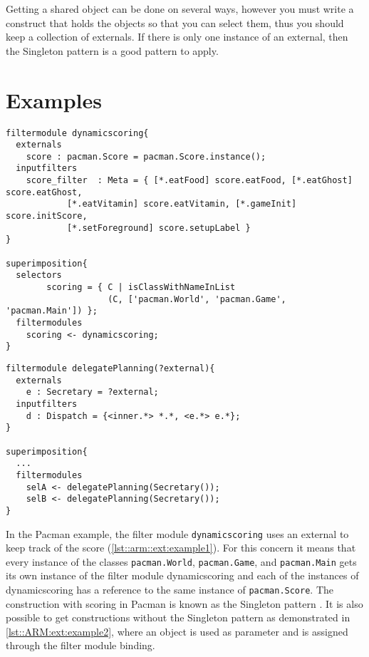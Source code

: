 Getting a shared object can be done on several ways, however you must write a construct that holds the objects so that
you can select them, thus you should keep a collection of externals. If there is only one instance of an external, then
the Singleton pattern is a good pattern to apply.

\section*{Examples}
\begin{lstlisting}[caption = {Dynamic scoring filter module from the Pacman example}, label = lst::arm::ext:example1,
style = listing, language = ComposeStar, float=tpb]
filtermodule dynamicscoring{
  externals
    score : pacman.Score = pacman.Score.instance();
  inputfilters 
    score_filter  : Meta = { [*.eatFood] score.eatFood, [*.eatGhost] score.eatGhost, 
			[*.eatVitamin] score.eatVitamin, [*.gameInit] score.initScore,
			[*.setForeground] score.setupLabel }
}

superimposition{
  selectors
		scoring = { C | isClassWithNameInList
		            (C, ['pacman.World', 'pacman.Game', 'pacman.Main']) };
  filtermodules
    scoring <- dynamicscoring;
}
\end{lstlisting}
\begin{lstlisting}[caption = {An external without the singleton construction}, label = lst::ARM:ext:example2,
style = listing, language = ComposeStar, float = tpb]
filtermodule delegatePlanning(?external){
  externals
    e : Secretary = ?external;
  inputfilters
    d : Dispatch = {<inner.*> *.*, <e.*> e.*};
}

superimposition{
  ...
  filtermodules
    selA <- delegatePlanning(Secretary());
    selB <- delegatePlanning(Secretary());
}
\end{lstlisting}
In the Pacman example, the filter module \lstinline!dynamicscoring! uses an external
to keep track of the score (\autoref{lst::arm::ext:example1}). For this concern it means that
every instance of the classes \lstinline!pacman.World!, \lstinline!pacman.Game!,
and \lstinline!pacman.Main! gets its own
instance of the filter module dynamicscoring and each of the instances of dynamicscoring has
a reference to the same instance of \lstinline!pacman.Score!. The construction with scoring in Pacman is
known as the Singleton pattern \cite{Gamma95}. It is also possible to get constructions without the Singleton pattern as demonstrated in \autoref{lst::ARM:ext:example2}, where an object is used as parameter and is assigned through the filter module binding.

